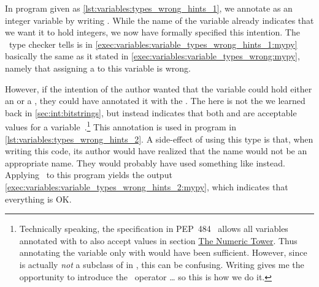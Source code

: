 In program  given as \cref{lst:variables:types_wrong_hints_1}, we annotate  as an integer variable by writing .
While the name of the variable already indicates that we want it to hold integers, we now have formally specified this intention.
The \mypy\ type checker tells is in \cref{exec:variables:variable_types_wrong_hints_1:mypy} basically the same as it stated in \cref{exec:variables:variable_types_wrong:mypy}, namely that assigning a  to this variable is wrong.

However, if the intention of the author wanted that the variable could hold either an  or a , they could have annotated it with the  .
The \pythonil{|} here is not the  we learned back in \cref{sec:int:bitstrings}, but instead indicates that both  and  are acceptable values for a variable~\cite{PEP604}.\footnote{%
Technically speaking, the  specification in PEP~484~\cite{PEP484} allows all variables annotated with  to also accept  values in section \href{https://peps.python.org/pep-0484/\#the-numeric-tower}{The Numeric Tower}. %
Thus annotating the variable only with  would have been sufficient. %
However, since  is actually \emph{not} a subclass of  in \python, this can be confusing. %
Writing  gives me the opportunity to introduce the \pythonil{|}~operator {\dots} so this is how we do it.%
}
This annotation is used in program  in \cref{lst:variables:types_wrong_hints_2}.
A side-effect of using this type is that, when writing this code, its author would have realized that the name  would not be an appropriate name.
They would probably have used something like  instead.
Applying \mypy\ to this program yields the output \cref{exec:variables:variable_types_wrong_hints_2:mypy}, which indicates that everything is OK.

